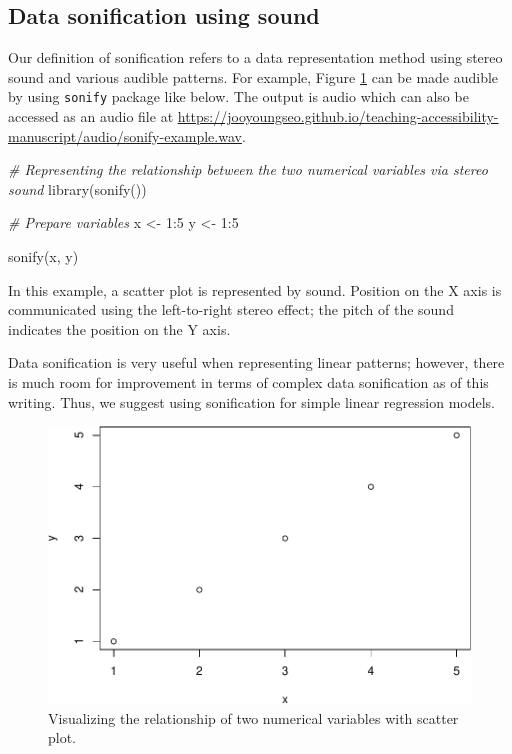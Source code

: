\documentclass[12pt]{article}
\newenvironment{Shaded}{\begin{snugshade}}{\end{snugshade}}
\newcommand{\CommentTok}[1]{\textcolor[rgb]{0.56,0.35,0.01}{\textit{#1}}}
\newcommand{\DecValTok}[1]{\textcolor[rgb]{0.00,0.00,0.81}{#1}}
\newcommand{\FunctionTok}[1]{\textcolor[rgb]{0.00,0.00,0.00}{#1}}
\newcommand{\NormalTok}[1]{#1}
\newcommand{\OtherTok}[1]{\textcolor[rgb]{0.56,0.35,0.01}{#1}}
\newcommand{\SpecialCharTok}[1]{\textcolor[rgb]{0.00,0.00,0.00}{#1}}
\begin{document}
\hypertarget{data-sonification-using-sound}{%
\subsection{Data sonification using sound}\label{data-sonification-using-sound}}

Our definition of sonification refers to a data representation method using stereo sound and various audible patterns. For example, Figure \ref{fig:plot-xy} can be made audible by using \texttt{sonify} package \citep{R-sonify} like below. The output is audio which can also be accessed as an audio file at \url{https://jooyoungseo.github.io/teaching-accessibility-manuscript/audio/sonify-example.wav}.

\begin{Shaded}
\begin{Highlighting}[]
\CommentTok{\# Representing the relationship between the two numerical variables via stereo sound}
\FunctionTok{library}\NormalTok{(}\FunctionTok{sonify}\NormalTok{())}

\CommentTok{\# Prepare variables}
\NormalTok{x }\OtherTok{\textless{}{-}} \DecValTok{1}\SpecialCharTok{:}\DecValTok{5}
\NormalTok{y }\OtherTok{\textless{}{-}} \DecValTok{1}\SpecialCharTok{:}\DecValTok{5}

\FunctionTok{sonify}\NormalTok{(x, y)}
\end{Highlighting}
\end{Shaded}

In this example, a scatter plot is represented by sound. Position on the X axis is communicated using the left-to-right stereo effect; the pitch of the sound indicates the position on the Y axis.

Data sonification is very useful when representing linear patterns; however, there is much room for improvement in terms of complex data sonification as of this writing. Thus, we suggest using sonification for simple linear regression models.

\begin{figure}
\includegraphics{figure/plot-xy-1} \caption{Visualizing the relationship of two numerical variables with scatter plot.}\label{fig:plot-xy}
\end{figure}
\end{document}
